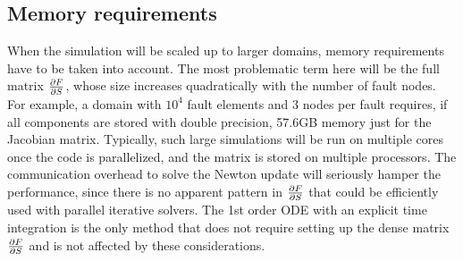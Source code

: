 \subsection{Memory requirements}
When the simulation will be scaled up to larger domains, memory requirements have to be taken into account. The most problematic term here will be the full matrix $\pdv{F}{S}$, whose size increases quadratically with the number of fault nodes. For example, a domain with $10^4$ fault elements and 3 nodes per fault requires, if all components are stored with double precision, 57.6GB memory just for the Jacobian matrix. Typically, such large simulations will be run on multiple cores once the code is parallelized, and the matrix is stored on multiple processors. The communication overhead to solve the Newton update will seriously hamper the performance, since there is no apparent pattern in $\pdv{F}{S}$ that could be efficiently used with parallel iterative solvers. The 1st order ODE with an explicit time integration is the only method that does not require setting up the dense matrix $\pdv{F}{S}$ and is not affected by these considerations. 

